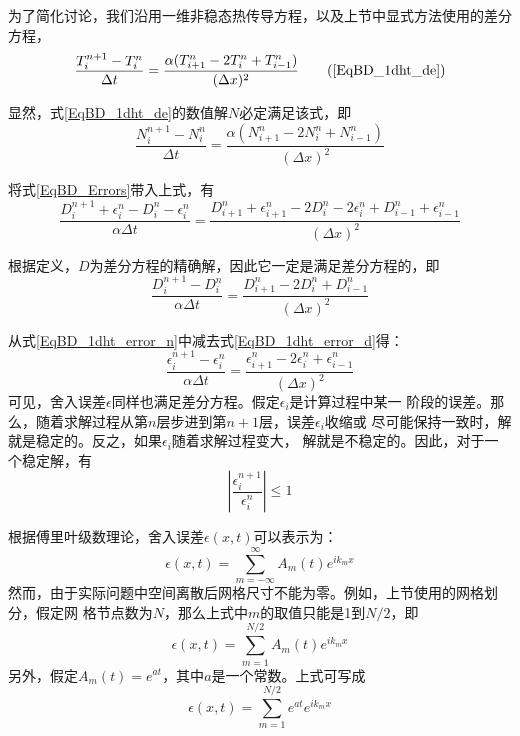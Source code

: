 为了简化讨论，我们沿用一维非稳态热传导方程，以及上节中显式方法使用的差分方程，
\begin{equation}
  \frac{T_{i}^{n+1}-T_{i}^{n}}{\Delta t}
  =
  \frac{\alpha(T_{i+1}^{n}-2T_{i}^{n}+T_{i-1}^{n})}{(\Delta x)^{2}}
  \tag{\ref{EqBD_1dht_de}}
\end{equation}

显然，式\eqref{EqBD_1dht_de}的数值解$N$必定满足该式，即
\begin{equation}
  \frac{N_{i}^{n+1}-N_{i}^{n}}{\Delta t}
  =
  \frac{\alpha(N_{i+1}^{n}-2N_{i}^{n}+N_{i-1}^{n})}{(\Delta x)^{2}}
  \label{EqBD_1dht_de_N}
\end{equation}

将式\eqref{EqBD_Errors}带入上式，有
\begin{equation}
  \frac{D_{i}^{n+1}+\epsilon_{i}^{n} - D_{i}^{n} - \epsilon_{i}^{n}}{\alpha \Delta t}
  =
  \frac{D_{i+1}^{n}+\epsilon_{i+1}^{n} - 2D_{i}^{n}-2\epsilon_{i}^{n}+D_{i-1}^{n}+\epsilon_{i-1}^{n}}{(\Delta x)^{2}}
  \label{EqBD_1dht_error_n}
\end{equation}

根据定义，$D$为差分方程的精确解，因此它一定是满足差分方程的，即
\begin{equation}
  \frac{D_{i}^{n+1}-D_{i}^{n}}{\alpha\Delta t}
  =
  \frac{D_{i+1}^{n}-2D_{i}^{n}+D_{i-1}^{n}}{(\Delta x)^{2}}
  \label{EqBD_1dht_error_d}
\end{equation}

从式\eqref{EqBD_1dht_error_n}中减去式\eqref{EqBD_1dht_error_d}得：
\begin{equation}
  \frac{\epsilon_{i}^{n+1}-\epsilon_{i}^{n}}{\alpha\Delta t}
  =
  \frac{\epsilon_{i+1}^{n}-2\epsilon_{i}^{n}+\epsilon_{i-1}^{n}}{(\Delta x)^{2}}
  \label{EqBD_1dht_error_e}
\end{equation}
可见，舍入误差$\epsilon$同样也满足差分方程。假定$\epsilon_{i}$是计算过程中某一
阶段的误差。那么，随着求解过程从第$n$层步进到第$n+1$层，误差$\epsilon_{i}$收缩或
尽可能保持一致时，解就是稳定的。反之，如果$\epsilon_{i}$随着求解过程变大，
解就是不稳定的。因此，对于一个稳定解，有
\begin{equation}
\left|
\frac{\epsilon_{i}^{n+1}}{\epsilon_{i}^{n}}
\right|
\le
1
\label{EqBD_Stability}
\end{equation}


根据傅里叶级数理论，舍入误差$\epsilon(x,t)$可以表示为：
\begin{equation}
  \epsilon(x,t) = \sum_{m=-\infty}^{\infty}A_{m}(t)e^{ik_{m}x}
\end{equation}
然而，由于实际问题中空间离散后网格尺寸不能为零。例如，上节使用的网格划分，假定网
格节点数为$N$，那么上式中$m$的取值只能是1到$N/2$，即
\begin{equation}
  \epsilon(x,t) = \sum_{m=1}^{N/2}A_{m}(t)e^{ik_{m}x}
\end{equation}
另外，假定$A_{m}(t)=e^{at}$，其中$a$是一个常数。上式可写成
\begin{equation}
  \epsilon(x,t) = \sum_{m=1}^{N/2}e^{at}e^{ik_{m}x}
  \label{EqBD_errors_expression}
\end{equation}

